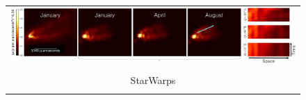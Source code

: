 






\begin{figure}
	\begin{center}

			\vspace*{-.35in}

	\begin{tabular}{  c c c  }
					\multicolumn{3}{c}{{\includegraphics[width=1\linewidth]{figures/m87/m87_figure_r2.pdf}} } 
					\\
					\vspace{-.25in} && \\
	\hspace{.8in}	\normalsize{\textsf{\cite{Johnson_dynamical} }}& \hspace{2.1in} \normalsize{\textsf{StarWarps }}&\hspace{1.5in} 	 \\
		\vspace{.1in} && 
\end{tabular}


\end{center}
\end{figure}
